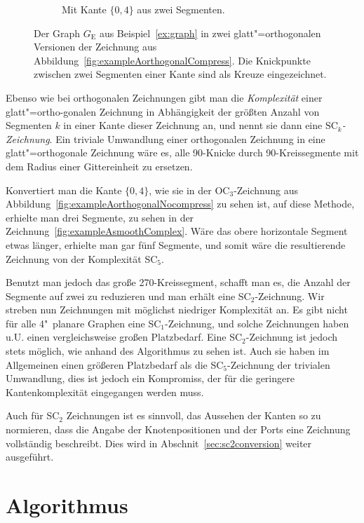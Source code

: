 \documentclass[a4paper]{scrreprt}
\theoremstyle{definition}
\begin{document}
\begin{figure}[h]
\begin{subfigure}[b]{0.6\textwidth}
  \caption{Mit Kante $\{0,4\}$ aus zwei Segmenten.}
  \label{fig:exampleAsmoothSimple}
\end{subfigure}
  \caption{Der Graph $G_\text{E}$ aus Beispiel~\ref{ex:graph} in zwei glatt"=orthogonalen Versionen der Zeichnung aus Abbildung~\ref{fig:exampleAorthogonalCompress}. Die Knickpunkte zwischen zwei Segmenten einer Kante sind als Kreuze eingezeichnet.}
  \label{fig:exampleAsmooth}
\end{figure}

Ebenso wie bei orthogonalen Zeichnungen gibt man die \emph{Komplexität} einer glatt"=ortho-gonalen Zeichnung in Abhängigkeit der größten Anzahl von Segmenten $k$ in einer Kante dieser Zeichnung an, und nennt sie dann eine \emph{$\text{SC}_k$-Zeichnung}. Ein triviale Umwandlung einer orthogonalen Zeichnung in eine glatt"=orthogonale Zeichnung wäre es, alle 90\textdegree-Knicke durch 90\textdegree-Kreissegmente mit dem Radius einer Gittereinheit zu ersetzen.

Konvertiert man die Kante $\{0,4\}$, wie sie in der OC$_3$-Zeichnung aus Abbildung~\ref{fig:exampleAorthogonalNocompress} zu sehen ist, auf diese Methode, erhielte man drei Segmente, zu sehen in der Zeichnung~\ref{fig:exampleAsmoothComplex}. Wäre das obere horizontale Segment etwas länger, erhielte man gar fünf Segmente, und somit wäre die resultierende Zeichnung von der Komplexität SC$_5$.

Benutzt man jedoch das große 270\textdegree-Kreissegment, schafft man es, die Anzahl der Segmente auf zwei zu reduzieren und man erhält eine SC$_2$-Zeichnung. Wir streben nun Zeichnungen mit möglichst niedriger Komplexität an. Es gibt nicht für alle 4"~planare Graphen eine SC$_1$-Zeichnung, und solche Zeichnungen haben u.U. einen vergleichsweise großen Platzbedarf. Eine SC$_2$-Zeichnung ist jedoch stets möglich, wie anhand des Algorithmus zu sehen ist. Auch sie haben im Allgemeinen einen größeren Platzbedarf als die SC$_5$-Zeichnung der trivialen Umwandlung, dies ist jedoch ein Kompromiss, der für die geringere Kantenkomplexität eingegangen werden muss. %

Auch für SC$_2$ Zeichnungen ist es sinnvoll, das Aussehen der Kanten so zu normieren, dass die Angabe der Knotenpositionen und der Ports eine Zeichnung vollständig beschreibt. Dies wird in Abschnit~\ref{sec:sc2conversion} weiter ausgeführt.




\chapter{Algorithmus}
\label{chap:algo}
\end{document}
